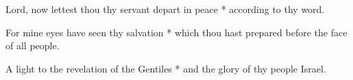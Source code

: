 Lord, now lettest thou thy servant depart in peace * according to thy word.

For mine eyes have seen thy salvation * which thou hast prepared before the face of all people.

A light to the revelation of the Gentiles * and the glory of thy people Israel.